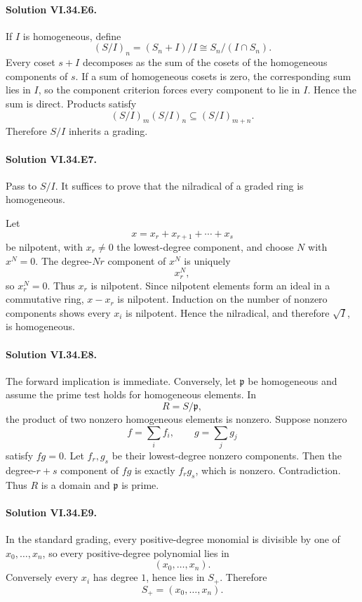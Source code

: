 \paragraph{Solution VI.34.E6.}
If \(I\) is homogeneous, define
\[
(S/I)_n=(S_n+I)/I\cong S_n/(I\cap S_n).
\]
Every coset \(s+I\) decomposes as the sum of the cosets of the homogeneous components of \(s\). If a sum of
homogeneous cosets is zero, the corresponding sum lies in \(I\), so the component criterion forces every component
to lie in \(I\). Hence the sum is direct. Products satisfy
\[
(S/I)_m(S/I)_n\subseteq(S/I)_{m+n}.
\]
Therefore \(S/I\) inherits a grading.

\paragraph{Solution VI.34.E7.}
Pass to \(S/I\). It suffices to prove that the nilradical of a graded ring is homogeneous.

Let
\[
x=x_r+x_{r+1}+\cdots+x_s
\]
be nilpotent, with \(x_r\ne0\) the lowest-degree component, and choose \(N\) with \(x^N=0\). The degree-\(Nr\)
component of \(x^N\) is uniquely
\[
x_r^N,
\]
so \(x_r^N=0\). Thus \(x_r\) is nilpotent. Since nilpotent elements form an ideal in a commutative ring,
\(x-x_r\) is nilpotent. Induction on the number of nonzero components shows every \(x_i\) is nilpotent. Hence the
nilradical, and therefore \(\sqrt I\), is homogeneous.

\paragraph{Solution VI.34.E8.}
The forward implication is immediate. Conversely, let \(\mathfrak p\) be homogeneous and assume the prime test
holds for homogeneous elements. In
\[
R=S/\mathfrak p,
\]
the product of two nonzero homogeneous elements is nonzero. Suppose nonzero
\[
f=\sum_if_i,\qquad g=\sum_jg_j
\]
satisfy \(fg=0\). Let \(f_r,g_s\) be their lowest-degree nonzero components. Then the degree-\(r+s\) component of
\(fg\) is exactly \(f_rg_s\), which is nonzero. Contradiction. Thus \(R\) is a domain and \(\mathfrak p\) is prime.

\paragraph{Solution VI.34.E9.}
In the standard grading, every positive-degree monomial is divisible by one of \(x_0,\ldots,x_n\), so every
positive-degree polynomial lies in
\[
(x_0,\ldots,x_n).
\]
Conversely every \(x_i\) has degree \(1\), hence lies in \(S_+\). Therefore
\[
\boxed{S_+=(x_0,\ldots,x_n)}.
\]

